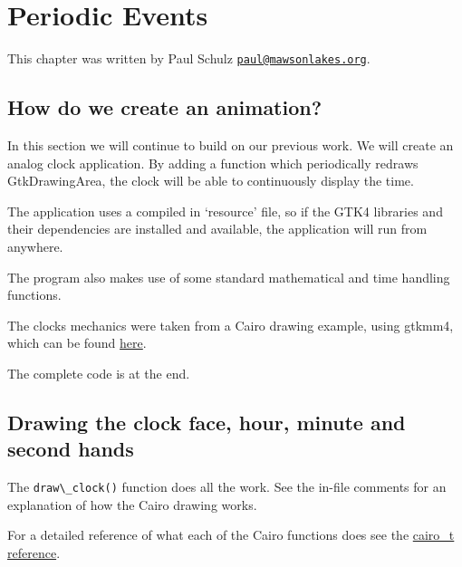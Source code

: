 \hypertarget{periodic-events}{%
\section{Periodic Events}\label{periodic-events}}

This chapter was written by Paul Schulz
\href{mailto:paul@mawsonlakes.org}{\nolinkurl{paul@mawsonlakes.org}}.

\hypertarget{how-do-we-create-an-animation}{%
\subsection{How do we create an
animation?}\label{how-do-we-create-an-animation}}

In this section we will continue to build on our previous work. We will
create an analog clock application. By adding a function which
periodically redraws GtkDrawingArea, the clock will be able to
continuously display the time.

The application uses a compiled in `resource' file, so if the GTK4
libraries and their dependencies are installed and available, the
application will run from anywhere.

The program also makes use of some standard mathematical and time
handling functions.

The clocks mechanics were taken from a Cairo drawing example, using
gtkmm4, which can be found
\href{https://developer-old.gnome.org/gtkmm-tutorial/stable/sec-drawing-clock-example.html.en}{here}.

The complete code is at the end.

\hypertarget{drawing-the-clock-face-hour-minute-and-second-hands}{%
\subsection{Drawing the clock face, hour, minute and second
hands}\label{drawing-the-clock-face-hour-minute-and-second-hands}}

The \passthrough{\lstinline!draw\_clock()!} function does all the work.
See the in-file comments for an explanation of how the Cairo drawing
works.

For a detailed reference of what each of the Cairo functions does see
the
\href{https://www.cairographics.org/manual/cairo-cairo-t.html}{cairo\_t
reference}.

